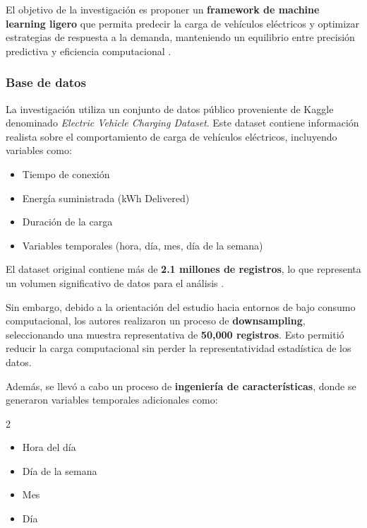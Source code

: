 El objetivo de la investigación es proponer un \textbf{framework de machine learning ligero} que permita predecir la carga de vehículos eléctricos y optimizar estrategias de respuesta a la demanda, manteniendo un equilibrio entre precisión predictiva y eficiencia computacional \cite{durrani2026}.

\subsubsection{Base de datos}

La investigación utiliza un conjunto de datos público proveniente de Kaggle denominado \textit{Electric Vehicle Charging Dataset}. Este dataset contiene información realista sobre el comportamiento de carga de vehículos eléctricos, incluyendo variables como:

\begin{itemize}
    \item Tiempo de conexión
    \item Energía suministrada (kWh Delivered)
    \item Duración de la carga
    \item Variables temporales (hora, día, mes, día de la semana)
\end{itemize}

El dataset original contiene más de \textbf{2.1 millones de registros}, lo que representa un volumen significativo de datos para el análisis \cite{durrani2026}.

Sin embargo, debido a la orientación del estudio hacia entornos de bajo consumo computacional, los autores realizaron un proceso de \textbf{downsampling}, seleccionando una muestra representativa de \textbf{50,000 registros}. Esto permitió reducir la carga computacional sin perder la representatividad estadística de los datos.

Además, se llevó a cabo un proceso de \textbf{ingeniería de características}, donde se generaron variables temporales adicionales como:

\begin{multicols}{2}
\begin{itemize}
    \item Hora del día
    \item Día de la semana
    \item Mes
    \item Día
\end{itemize}
\end{multicols}

